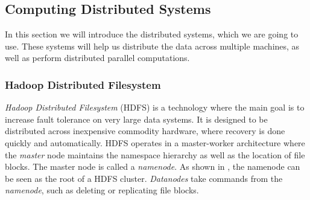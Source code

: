\subsection{Computing Distributed Systems}\label{sec:distributed}
In this section we will introduce the distributed systems, which we are going to use. These systems will help us distribute the data across multiple machines, as well as perform distributed parallel computations. 

\subsubsection{Hadoop Distributed Filesystem}\label{sec:hadoopfilesystem}
\emph{Hadoop Distributed Filesystem} (HDFS) is a technology where the main goal is to increase fault tolerance on very large data systems. It is designed to be distributed across inexpensive commodity hardware, where recovery is done quickly and automatically. HDFS operates in a master-worker architecture where the \emph{master} node maintains the namespace hierarchy as well as the location of file blocks. The master node is called a \emph{namenode}. As shown in , the namenode can be seen as the root of a HDFS cluster. \emph{Datanodes} take commands from the \emph{namenode}, such as deleting or replicating file blocks.

